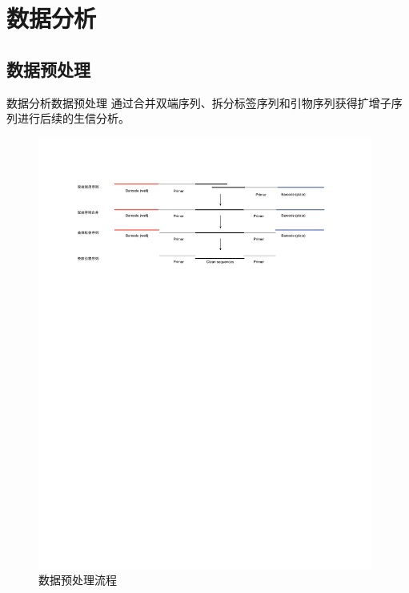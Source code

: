 \documentclass[UTF8]{ctexbeamer}
\begin{document}

	\section{数据分析}

	\subsection{数据预处理}
	\begin{frame}{数据分析}{数据预处理}
		\qquad 通过合并双端序列、拆分标签序列和引物序列获得扩增子序列进行后续的生信分析。

		\begin{figure}
			\centering
			\includegraphics[width=0.98\textwidth]{img/数据预处理.pdf}
			\caption{数据预处理流程}
		\end{figure}
	\end{frame}

\end{document}
